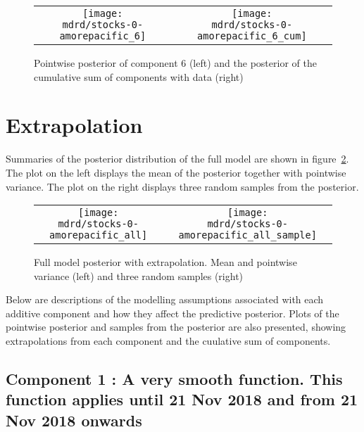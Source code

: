 \documentclass{article} %
\begin{document}
\begin{figure}[H]
\newcommand{\wmgd}{0.5\columnwidth}
\newcommand{\hmgd}{3.0cm}
\newcommand{\mdrd}{stocks-0-amorepacific}
\newcommand{\mbm}{\hspace{-0.3cm}}
\begin{tabular}{cc}
\mbm \texttt{[image: \\mdrd/stocks-0-amorepacific\_6]} & \texttt{[image: \\mdrd/stocks-0-amorepacific\_6\_cum]}
\end{tabular}
\caption{Pointwise posterior of component 6 (left) and the posterior of the cumulative sum of components with data (right)}
\label{fig:comp6}
\end{figure}

\section{Extrapolation}
\label{sec:extrap}

Summaries of the posterior distribution of the full model are shown in figure~\ref{fig:extrap}.
The plot on the left displays the mean of the posterior together with pointwise variance.
The plot on the right displays three random samples from the posterior.

\begin{figure}[H]
\newcommand{\wmgd}{0.5\columnwidth}
\newcommand{\hmgd}{3.0cm}
\newcommand{\mdrd}{stocks-0-amorepacific}
\newcommand{\mbm}{\hspace{-0.3cm}}
\begin{tabular}{cc}
\mbm \texttt{[image: \\mdrd/stocks-0-amorepacific\_all]} & \texttt{[image: \\mdrd/stocks-0-amorepacific\_all\_sample]}
\end{tabular}
\caption{Full model posterior with extrapolation. Mean and pointwise variance (left) and three random samples (right)}
\label{fig:extrap}
\end{figure}

Below are descriptions of the modelling assumptions associated with each additive component and how they affect the predictive posterior.
Plots of the pointwise posterior and samples from the posterior are also presented, showing extrapolations from each component and the cuulative sum of components.

\subsection{Component 1 : A very smooth function. This function applies until 21 Nov 2018 and from 21 Nov 2018 onwards}
\end{document}
